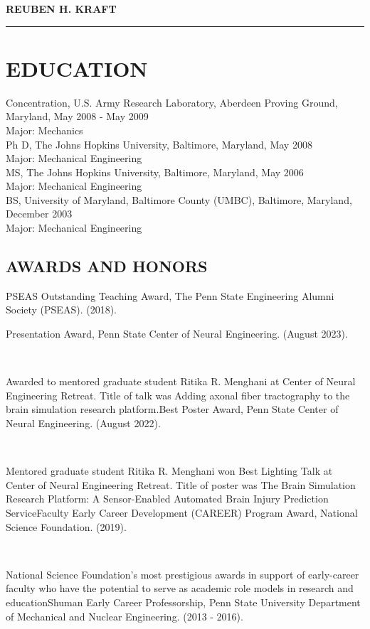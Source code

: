 \documentclass[a4paper,10pt]{article}
\author{}
\date{}
\begin{document}
\begin{center}
\LARGE \textbf{\textsc{REUBEN H. KRAFT}} \\
\rule{\linewidth}{2pt}
\end{center}
\normalsize %

\section*{EDUCATION}
Concentration, U.S. Army Research Laboratory, Aberdeen Proving Ground, Maryland, May 2008 - May 2009 \\ 
Major: Mechanics \\[0.2cm]
Ph D, The Johns Hopkins University, Baltimore, Maryland, May 2008 \\ 
Major: Mechanical Engineering \\[0.2cm]
MS, The Johns Hopkins University, Baltimore, Maryland, May 2006 \\ 
Major: Mechanical Engineering \\[0.2cm]
BS, University of Maryland, Baltimore County (UMBC), Baltimore, Maryland, December 2003 \\ 
Major: Mechanical Engineering \\[0.2cm]
\subsection*{AWARDS AND HONORS}

PSEAS Outstanding Teaching Award, The Penn State Engineering Alumni Society (PSEAS). (2018).

\Outstanding Presentation Award, Penn State Center of Neural Engineering. (August 2023).

\ 

Awarded to mentored graduate student Ritika R. Menghani at Center of Neural Engineering Retreat. Title of talk was Adding axonal fiber tractography to the brain simulation research platform.Best Poster Award, Penn State Center of Neural Engineering. (August 2022).

\ 

Mentored graduate student Ritika R. Menghani won Best Lighting Talk at Center of Neural Engineering Retreat. Title of poster was The Brain Simulation Research Platform: A Sensor-Enabled Automated Brain Injury Prediction ServiceFaculty Early Career Development (CAREER) Program Award, National Science Foundation. (2019).

\ 

National Science Foundation's most prestigious awards in support of early-career faculty who have the potential to serve as academic role models in research and educationShuman Early Career Professorship, Penn State University Department of Mechanical and Nuclear Engineering. (2013 - 2016).
\end{document}
